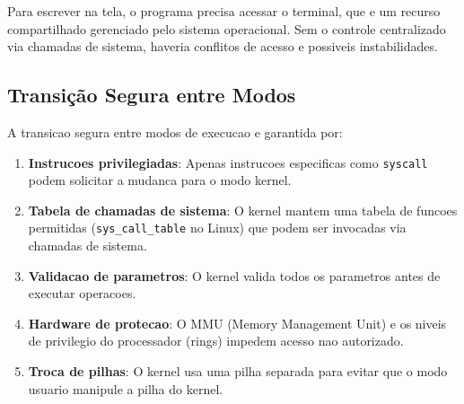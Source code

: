 \documentclass[10pt,a4paper]{article}
\begin{document}
Para escrever na tela, o programa precisa acessar o terminal, que e um recurso compartilhado gerenciado pelo sistema operacional. Sem o controle centralizado via chamadas de sistema, haveria conflitos de acesso e possiveis instabilidades.

\subsection{Transição Segura entre Modos}

A transicao segura entre modos de execucao e garantida por:

\begin{enumerate}
  \item \textbf{Instrucoes privilegiadas}: Apenas instrucoes especificas como \texttt{syscall} podem solicitar a mudanca para o modo kernel.

  \item \textbf{Tabela de chamadas de sistema}: O kernel mantem uma tabela de funcoes permitidas (\texttt{sys\_call\_table} no Linux) que podem ser invocadas via chamadas de sistema.

  \item \textbf{Validacao de parametros}: O kernel valida todos os parametros antes de executar operacoes.

  \item \textbf{Hardware de protecao}: O MMU (Memory Management Unit) e os niveis de privilegio do processador (rings) impedem acesso nao autorizado.

  \item \textbf{Troca de pilhas}: O kernel usa uma pilha separada para evitar que o modo usuario manipule a pilha do kernel.
\end{enumerate}
\end{document}
